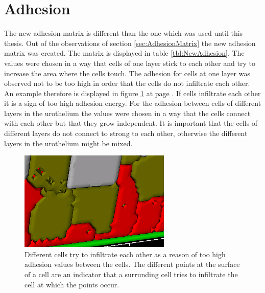 \section{Adhesion}
The new adhesion matrix is different than the one which was used until this thesis. Out of the observations of section \ref{sec:AdhesionMatrix} the new adhesion matrix was created. The matrix is displayed in table \ref{tbl:NewAdhesion}. The values were chosen in a way that cells of one layer stick to each other and try to increase the area where the cells touch. The adhesion for cells at one layer was observed not to be too high in order that the cells do not infiltrate each other. An example therefore is displayed in figure \ref{img:InfiltratingCells} at page \pageref{img:InfiltratingCells}. If cells infiltrate each other it is a sign of too high adhesion energy. For the adhesion between cells of different layers in the urothelium the values were chosen in a way that the cells connect with each other but that they grow independent. It is important that the cells of different layers do not connect to strong to each other, otherwise the different layers in the urothelium might be mixed. 
\begin{figure}[ht]
	\center
	\includegraphics[scale=1.2]{figures/TooHighAdhesion1.png}
	\caption[Different cells try to infiltrate each other]{Different cells try to infiltrate each other as a reason of too high adhesion values between the cells. The different points at the surface of a cell are an indicator that a surrunding cell tries to infiltrate the cell at which the points occur.}
	\label{img:InfiltratingCells}
\end{figure}


